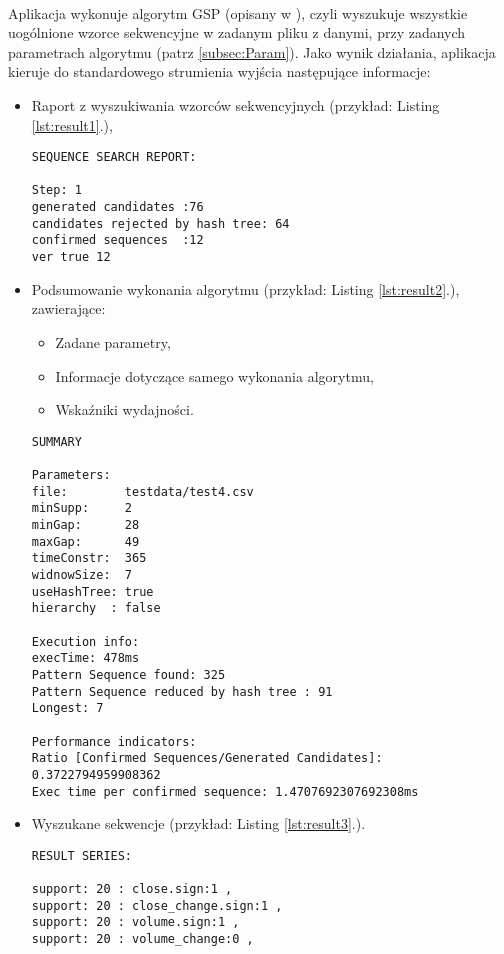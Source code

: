 \documentclass[11pt,a4paper]{article}
\begin{document}
\paragraph{} Aplikacja wykonuje algorytm GSP (opisany w \cite{bib:GSP}), czyli wyszukuje wszystkie uogólnione wzorce sekwencyjne w zadanym pliku z danymi, przy zadanych parametrach algorytmu (patrz \ref{subsec:Param}). Jako wynik działania, aplikacja kieruje do standardowego strumienia wyjścia następujące informacje:
\begin{itemize}
\item Raport z wyszukiwania wzorców sekwencyjnych (przykład: Listing \ref{lst:result1}.),
\begin{lstlisting}[caption={Raport z wyszukiwania},label={lst:result1}]
SEQUENCE SEARCH REPORT:

Step: 1
generated candidates :76
candidates rejected by hash tree: 64
confirmed sequences  :12
ver true 12
\end{lstlisting}
\item Podsumowanie wykonania algorytmu (przykład: Listing \ref{lst:result2}.), zawierające:
\begin{itemize}
\item Zadane parametry,
\item Informacje dotyczące samego wykonania algorytmu,
\item Wskaźniki wydajności.
\end{itemize}
\begin{lstlisting}[caption={Podsumowanie},label={lst:result2}]
SUMMARY

Parameters:
file:        testdata/test4.csv
minSupp:     2
minGap:      28
maxGap:      49
timeConstr:  365
widnowSize:  7
useHashTree: true
hierarchy  : false

Execution info:
execTime: 478ms
Pattern Sequence found: 325
Pattern Sequence reduced by hash tree : 91
Longest: 7

Performance indicators:
Ratio [Confirmed Sequences/Generated Candidates]: 0.3722794959908362
Exec time per confirmed sequence: 1.4707692307692308ms
\end{lstlisting}
\item Wyszukane sekwencje (przykład: Listing \ref{lst:result3}.).
\begin{lstlisting}[caption={Wyszukane sekwencje},label={lst:result3}]
RESULT SERIES:

support: 20 : close.sign:1 , 
support: 20 : close_change.sign:1 , 
support: 20 : volume.sign:1 , 
support: 20 : volume_change:0 , 
\end{lstlisting}
\end{itemize}
\end{document}
